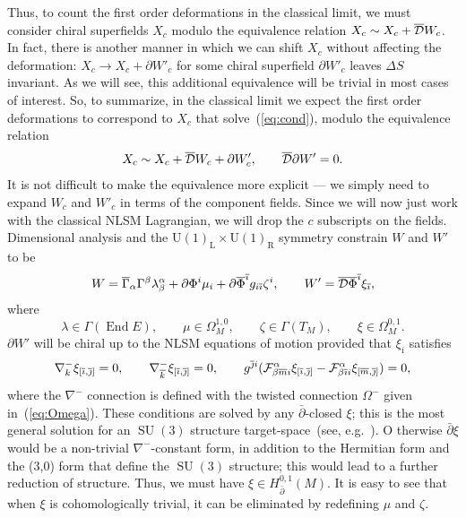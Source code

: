 \documentclass[11pt, a4paper]{article}
\def\cDb{{\overline{\cD}}}
\def\GUL{\GU(1)_{\text{L}}}
\def\GUR{\GU(1)_{\text{R}}}
\def\End{\operatorname{End}}
\def\SU{\operatorname{SU}}
\def\GU{\operatorname{U{}}}
\def\p{\partial}
\def\pb{\bar{\partial}}
\def\cD{{\cal D}}
\def\cF{{\cal F}}
\newcommand\Gammab{\overline{\Gamma}}
\newcommand\Phib{\overline{\Phi}}
\newcommand\ib{\overline{\imath}}
\newcommand\jb{\overline{\jmath}}
\newcommand\kb{\overline{k}}
\newcommand\mb{\overline{m}}
\def\cDb{\overline{\cD}}
\begin{document}
Thus, to count the first order deformations in the classical limit, we must consider
chiral superfields $X_c$ modulo the equivalence relation $X_c \sim X_c + \cDb W_c$.
In fact, there is another manner in which we can shift $X_c$ without affecting the
deformation: $X_c \to X_c + \p W'_c$ for some chiral superfield $\p W'_c$ leaves $\Delta S$ invariant.  As we will see, this additional equivalence will be trivial in most cases of interest.  So, to summarize, in the classical limit we expect the first order
deformations to correspond to $X_c$ that solve~(\ref{eq:cond}), modulo the equivalence relation
\begin{align*}
X_c \sim X_c + \cDb W_c + \p W'_c ,\qquad \cDb \p W' = 0.
\end{align*}
It is not difficult to make the equivalence more explicit --- we simply need to expand
$W_c$ and $W'_c$ in terms of the component fields.  Since we will now just work with
the classical NLSM Lagrangian, we will drop the $c$ subscripts on the fields.  Dimensional 
analysis and the $\GUL\times \GUR$ symmetry constrain $W$ and $W'$ to be
\begin{align*}
W =  \Gammab_{\alpha}\Gamma^\beta \lambda^\alpha_{\beta} + \p\Phi^i \mu_i +
 \p\Phib^{\ib}g_{i\ib} {\zeta}^i, \qquad
W'  = \cDb \Phib^{\ib}\xi_{\ib}, 
\end{align*}
where
$$
\lambda \in \Gamma(\End E ), \qquad
\mu \in \Omega^{1,0}_M, \qquad
\zeta \in \Gamma( T_M), \qquad \xi \in \Omega^{0,1}_M.
$$
$\p W'$ will be chiral up to the NLSM equations of motion provided that $\xi_{\ib}$ satisfies
\begin{align*}
\nabla^-_k \xi_{[\ib,\jb]} = 0, \qquad
\nabla^-_{\kb}\xi_{[\ib,\jb]} = 0, \qquad
g^{\jb i} (\cF^\alpha_{\beta\mb i} \xi_{[\ib,\jb]} - \cF^\alpha_{\beta\ib i} \xi_{[\mb,\jb]} ) = 0,
\end{align*}
where the $\nabla^-$ connection is defined with the twisted connection $\Omega^-$
given in~(\ref{eq:Omega}).  These conditions are solved by any $\pb$-closed $\xi$;
this is the most general solution for an $\SU(3)$ structure target-space~(see, e.g.~\cite{Grana:2005jc}).  O
therwise $\pb \xi$ would be a non-trivial $\nabla^-$-constant
form, in addition to the Hermitian form and the (3,0) form that define the $\SU(3)$ structure;  this would lead to 
a further reduction of structure.
Thus, we must have $\xi \in H^{0,1}_{\pb} (M)$. It is easy to see that when $\xi$ is cohomologically
trivial, it can be eliminated by redefining $\mu$ and $\zeta$.
\end{document}
